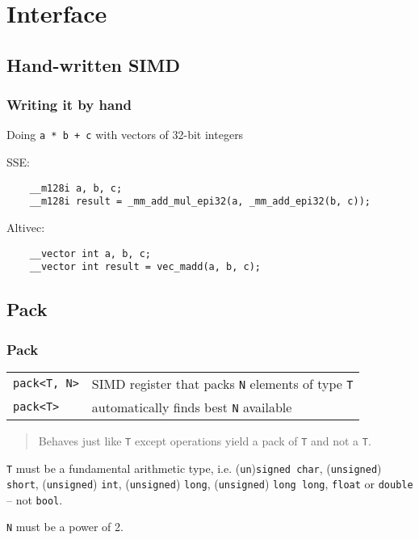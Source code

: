 \documentclass{beamer}
\begin{document}
\section{Interface}

\subsection{Hand-written SIMD}
\begin{frame}[fragile]
	\frametitle{Writing it by hand}

	Doing \lstinline{a * b + c} with vectors of 32-bit integers
	\bigskip

	SSE:
	\begin{lstlisting}
	__m128i a, b, c;
	__m128i result = _mm_add_mul_epi32(a, _mm_add_epi32(b, c));
	\end{lstlisting}
	\bigskip
	
	Altivec:
	\begin{lstlisting}
	__vector int a, b, c;
	__vector int result = vec_madd(a, b, c);
	\end{lstlisting}	
	
\end{frame}

\subsection{Pack}

\begin{frame}
	\frametitle{Pack}
	
	\begin{tabular}{ll}
	\lstinline{pack<T, N>} & SIMD register that packs \lstinline{N} elements of type \lstinline{T}\\
	\lstinline{pack<T>} & automatically finds best \lstinline{N} available
	\end{tabular}
	\bigskip	
	
	\begin{quote} Behaves just like \lstinline{T} except operations yield a pack of \lstinline{T} and not a \lstinline{T}. \end{quote}
	\bigskip	
	
	\lstinline{T} must be a fundamental arithmetic type, i.e. (\lstinline{un})\lstinline{signed char}, (\lstinline{unsigned}) \lstinline{short}, (\lstinline{unsigned}) \lstinline{int}, (\lstinline{unsigned}) \lstinline{long}, (\lstinline{unsigned}) \lstinline{long long}, \lstinline{float} or \lstinline{double} -- not \lstinline{bool}.
	\bigskip
	
	\lstinline{N} must be a power of 2.
	
\end{frame}
\end{document}
